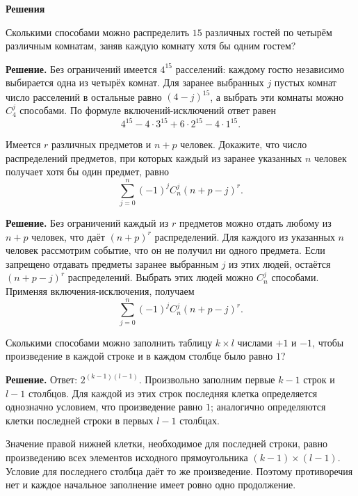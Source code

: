 

\ifPDFTeX
  \renewcommand{\rmdefault}{cmr}
\fi

\def\SheetNo{5}
\setlength{\emergencystretch}{2em}


\begin{center}\textbf{Решения}\end{center}

\begin{problems}

\item Сколькими способами можно распределить $15$ различных гостей по четырём различным комнатам, заняв каждую комнату хотя бы одним гостем?
\par\smallskip\noindent\textbf{Решение.} Без ограничений имеется $4^{15}$ расселений: каждому гостю независимо выбирается одна из четырёх комнат. Для заранее выбранных $j$ пустых комнат число расселений в остальные равно $(4-j)^{15}$, а выбрать эти комнаты можно $C_4^j$ способами. По формуле включений-исключений ответ равен
\[
4^{15}-4\cdot3^{15}+6\cdot2^{15}-4\cdot1^{15}.
\]\par

\item Имеется $r$ различных предметов и $n+p$ человек. Докажите, что число распределений предметов, при которых каждый из заранее указанных $n$ человек получает хотя бы один предмет, равно
\[
\sum_{j=0}^{n}(-1)^j C_n^j(n+p-j)^r.
\]
\par\smallskip\noindent\textbf{Решение.} Без ограничений каждый из $r$ предметов можно отдать любому из $n+p$ человек, что даёт $(n+p)^r$ распределений. Для каждого из указанных $n$ человек рассмотрим событие, что он не получил ни одного предмета. Если запрещено отдавать предметы заранее выбранным $j$ из этих людей, остаётся $(n+p-j)^r$ распределений. Выбрать этих людей можно $C_n^j$ способами. Применяя включения-исключения, получаем
\[
\sum_{j=0}^{n}(-1)^j C_n^j(n+p-j)^r.
\]\par

\item Сколькими способами можно заполнить таблицу $k\times l$ числами $+1$ и $-1$, чтобы произведение в каждой строке и в каждом столбце было равно $1$?
\par\smallskip\noindent\textbf{Решение.} Ответ: $2^{(k-1)(l-1)}$. Произвольно заполним первые $k-1$ строк и $l-1$ столбцов. Для каждой из этих строк последняя клетка определяется однозначно условием, что произведение равно $1$; аналогично определяются клетки последней строки в первых $l-1$ столбцах.
\par Значение правой нижней клетки, необходимое для последней строки, равно произведению всех элементов исходного прямоугольника $(k-1)\times(l-1)$. Условие для последнего столбца даёт то же произведение. Поэтому противоречия нет и каждое начальное заполнение имеет ровно одно продолжение.\par


\end{problems}
